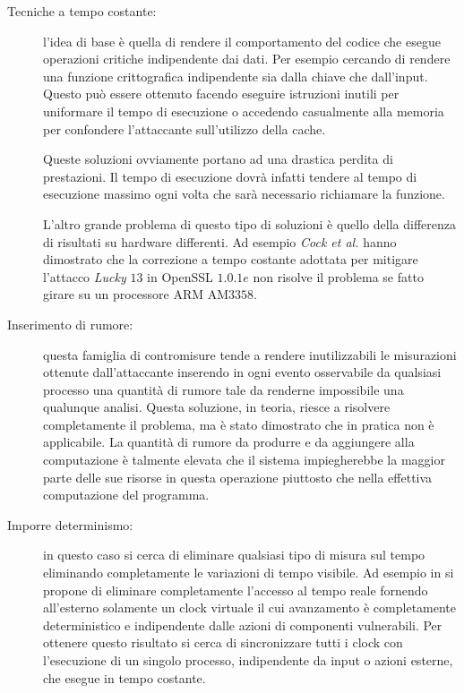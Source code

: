 			\begin{description}
				\item[Tecniche a tempo costante:] l'idea di base è quella di rendere il comportamento del codice che esegue operazioni critiche indipendente dai dati. Per esempio cercando di rendere una funzione crittografica indipendente sia dalla chiave che dall'input. Questo può essere ottenuto facendo eseguire istruzioni inutili per uniformare il tempo di esecuzione o accedendo casualmente alla memoria per confondere l'attaccante sull'utilizzo della cache. 
				
				Queste soluzioni ovviamente portano ad una drastica perdita di prestazioni. Il tempo di esecuzione dovrà infatti tendere al tempo di esecuzione massimo ogni volta che sarà necessario richiamare la funzione.
				
				L'altro grande problema di questo tipo di soluzioni è quello della differenza di risultati su hardware differenti. Ad esempio \emph{Cock et al.}\cite{cock2014last} hanno dimostrato che la correzione a tempo costante adottata per mitigare l'attacco \emph{Lucky} $13$\cite{al2013lucky} in OpenSSL $1.0.1e$ non risolve il problema se fatto girare su un processore ARM AM$3358$. 
				\item[Inserimento di rumore:] questa famiglia di contromisure tende a rendere inutilizzabili le misurazioni ottenute dall'attaccante inserendo in ogni evento osservabile da qualsiasi processo una quantità di rumore tale da renderne impossibile una qualunque analisi\cite{hu1992reducing}. Questa soluzione, in teoria, riesce a risolvere completamente il problema, ma è stato dimostrato\cite{cock2014last} che in pratica non è applicabile. La quantità di rumore da produrre e da aggiungere alla computazione è talmente elevata che il sistema impiegherebbe la maggior parte delle sue risorse in questa operazione piuttosto che nella effettiva computazione del programma.
				\item[Imporre determinismo:] in questo caso si cerca di eliminare qualsiasi tipo di misura sul tempo eliminando completamente le variazioni di tempo visibile. Ad esempio in \cite{aviram2012efficient} si propone di eliminare completamente l'accesso al tempo reale fornendo all'esterno solamente un clock virtuale il cui avanzamento è completamente deterministico e indipendente dalle azioni di componenti vulnerabili. Per ottenere questo risultato si cerca di sincronizzare tutti i clock con l'esecuzione di un singolo processo, indipendente da input o azioni esterne, che esegue in tempo costante.

\end{description}

